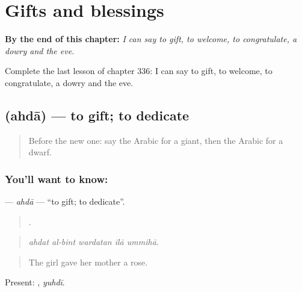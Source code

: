
\chapter{Gifts and blessings}
\label{ch:ar-gifts-and-blessings}

\begin{chapteropening}
\textbf{By the end of this chapter:} \emph{I can say to gift, to welcome, to congratulate, a dowry and the eve.}

Complete the last lesson of chapter 336: I can say to gift, to welcome, to congratulate, a dowry and the eve.
\end{chapteropening}

\section[\texorpdfstring{\ar{أهدى} (ahdā)}{أهدى (ahdā)}]{ (ahdā) — to gift; to dedicate}

\label{lesson:AR-C336-ahda}



\begin{quote}
Before the new one: say the Arabic for a giant, then the Arabic for a dwarf.
\end{quote}

\subsection*{You'll want to know: }
\textbf{} — \emph{ahdā} — \textquotedblleft{}to gift; to dedicate\textquotedblright{}.

\begin{quote}
    .
\end{quote}

\begin{quote}
\emph{ahdat al-bint wardatan ilā ummihā.}
\end{quote}

\begin{quote}
The girl gave her mother a rose.
\end{quote}

Present: , \emph{yuhdī}.


